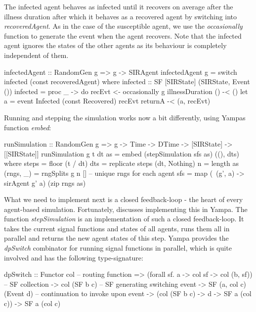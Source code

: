 The infected agent behaves as infected until it recovers on average after the illness duration after which it behaves as a recovered agent by switching into \textit{recoveredAgent}. As in the case of the susceptible agent, we use the \textit{occasionally} function to generate the event when the agent recovers. Note that the infected agent ignores the states of the other agents as its behaviour is completely independent of them.

\begin{HaskellCode}
infectedAgent :: RandomGen g => g -> SIRAgent
infectedAgent g = switch infected (const recoveredAgent)
  where
    infected :: SF [SIRState] (SIRState, Event ())
    infected = proc _ -> do
      recEvt <- occasionally g illnessDuration () -< ()
      let a = event Infected (const Recovered) recEvt
      returnA -< (a, recEvt)
\end{HaskellCode}

Running and stepping the simulation works now a bit differently, using Yampas function \textit{embed}:

\begin{HaskellCode}
runSimulation :: RandomGen g 
  => g -> Time -> DTime -> [SIRState] -> [[SIRState]]
runSimulation g t dt as 
    = embed (stepSimulation sfs as) ((), dts)
  where
    steps     = floor (t / dt)
    dts       = replicate steps (dt, Nothing)
    n         = length as
    (rngs, _) = rngSplits g n [] -- unique rngs for each agent
    sfs       = map (\ (g', a) -> sirAgent g' a) (zip rngs as)
\end{HaskellCode}

What we need to implement next is a closed feedback-loop - the heart of every agent-based simulation. Fortunately, \cite{nilsson_functional_2002, courtney_yampa_2003} discusses implementing this in Yampa. The function \textit{stepSimulation} is an implementation of such a closed feedback-loop. It takes the current signal functions and states of all agents, runs them all in parallel and returns the new agent states of this step. Yampa provides the \textit{dpSwitch} combinator for running signal functions in parallel, which is quite involved and has the following type-signature:

\begin{HaskellCode}
dpSwitch :: Functor col
         -- routing function
         => (forall sf. a -> col sf -> col (b, sf))
         -- SF collection
         -> col (SF b c)
         -- SF generating switching event     
         -> SF (a, col c) (Event d)
         -- continuation to invoke upon event           
         -> (col (SF b c) -> d -> SF a (col c))
         -> SF a (col c)
\end{HaskellCode}

